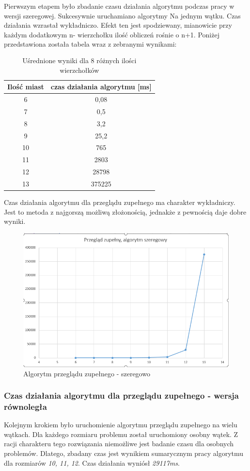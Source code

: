 \documentclass{article}
\begin{document}
		Pierwszym etapem było zbadanie czasu działania algorytmu podczas pracy w wersji szeregowej. Sukcesywnie uruchamiano algorytmy Na jednym wątku. Czas działania wzrastał wykładniczo. Efekt ten jest spodziewany, mianowicie przy każdym dodatkowym n- wierzchołku ilość obliczeń rośnie o n+1. Poniżej przedstawiona została tabela wraz z zebranymi wynikami:
		\begin{table}[H]
			\centering
			\caption{Uśrednione wyniki dla 8 różnych ilości wierzchołków}
			\begin{tabular}{|c|c|}
				
				\hline Ilość miast  & czas działania algorytmu [ms] \\ 
				\hline 	6& 0,08 \\ 
				\hline  7& 0,5 \\ 
				\hline  8& 3,2\\ 
				\hline  9& 25,2\\ 
				\hline  10& 765\\ 
				\hline  11& 2803\\ 
				\hline  12& 28798\\ 
				\hline  13& 375225\\ 
				
				\hline 
			\end{tabular} 
		\end{table}
		Czas działania algorytmu dla przeglądu zupełnego ma charakter wykładniczy. Jest to metoda z najgorszą możliwą złożonością, jednakże z pewnością daje dobre wyniki.
		\begin{figure}
			\centering
			\includegraphics[width=0.7\linewidth]{bfS}
			\caption{Algorytm przeglądu zupełnego - szeregowo}
		\end{figure}
		\subsubsection{Czas działania algorytmu dla przeglądu zupełnego - wersja równoległa}
			Kolejnym krokiem było uruchomienie algorytmu przeglądu zupełnego na wielu wątkach. Dla każdego rozmiaru problemu został uruchomiony osobny wątek. Z racji charakteru tego rozwiązania niemożliwe jest badanie czasu dla osobnych problemów. Dlatego, zbadany czas jest wynikiem sumarycznym pracy algorytmu dla rozmiarów {\it 10, 11, 12}. Czas działania wyniósł {\it 29117ms}. 
			
\end{document}
